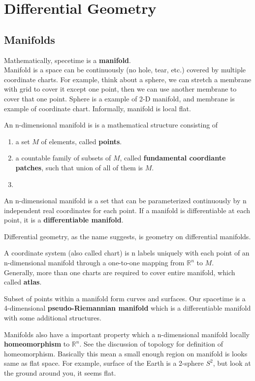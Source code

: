 \documentclass[12pt]{article}
\theoremstyle{mystyle}{\newtheorem{definition}{Definition}[section]}
\theoremstyle{mystyle}{\newtheorem{theorem}[definition]{Theorem}}
\theoremstyle{mystyle}{\newtheorem*{remark}{Remark}}
\theoremstyle{mystyle}{\newtheorem*{example}{Example}}
\theoremstyle{mystyle}{\newtheorem*{examples}{Examples}}
\theoremstyle{cstyle}{\newtheorem*{cthm}{}}
\begin{document}
\newpage

\section{Differential Geometry}

\subsection{Manifolds}
Mathematically, specetime is a \textbf{manifold}.\\
Manifold is a space can be continuously (no hole, tear, etc.) covered by multiple coordinate charts.
For example, think about a sphere, we can stretch a membrane with grid to cover it except one point, then we can
use another membrane to cover that one point. Sphere is a example of 2-D manifold, and membrane is example of coordinate chart.
Informally, manifold is local flat.
\begin{definition}
  An n-dimensional manifold is is a mathematical structure consisting of
  \begin{enumerate}
    \item a set \(M\) of elements, called \textbf{points}.
    \item a countable family of subsets of \(M\), called \textbf{fundamental coordiante patches},
          such that union of all of them is \(M\).
    \item
  \end{enumerate}
  An n-dimensional manifold is a set that can be parameterized continuously by n independent real coordinates for each point.
  If a manifold is differentiable at each point, it is a \textbf{differentiable manifold}.
\end{definition}
Differential geometry, as the name suggests, is geometry on differential manifolds.
\begin{definition}
  A coordinate system (also called chart) is n labels uniquely with each point of an n-dimensional manifold through a one-to-one mapping from
  $\mathbb{R}^n$ to $M$.\\
  Generally, more than one charts are required to cover entire manifold, which called \textbf{atlas}.
\end{definition}

Subset of points within a manifold form curves and surfaces.
Our spacetime is a 4-dimensional \textbf{pseudo-Riemannian manifold}
which is a differentiable manifold with some additional structures.
\begin{remark}
  Manifolds also have a important property which a n-dimensional manifold locally \textbf{homeomorphism} to $\mathbb{R}^n$. See the discussion of
  topology for definition of homeomorphism. Basically this mean a small enough region on manifold is looks same as flat space.
  For example, surface of the Earth is a 2-sphere $S^2$, but look at the ground around you, it seems flat.
\end{remark}
\end{document}
